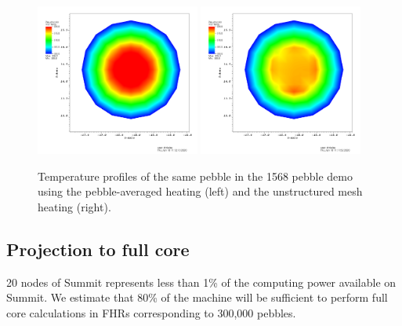 \begin{figure}[htb!]
\centering
\includegraphics[clip=true,width=0.48\textwidth]{Figures/openmc_cell_temperature_zoomed}
\includegraphics[clip=true,width=0.48\textwidth]{Figures/openmc_mesh_temperature_zoomed}
\caption{Temperature profiles of the same pebble in the 1568 pebble demo using the pebble-averaged heating (left) and the unstructured mesh heating (right).}
\label{f:1568_openmc_temperatures_single_pebble}
\end{figure}

\subsection{Projection to full core}

20 nodes of Summit represents less than 1\% of the computing power available on Summit.
We estimate that 80\% of the machine will be sufficient to perform full core calculations in FHRs corresponding to 300,000 pebbles.
